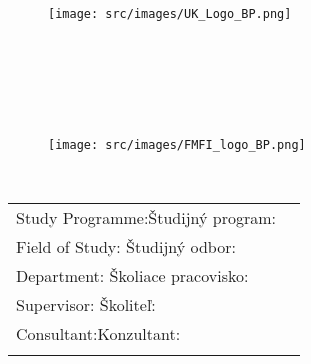 \documentclass[12pt, openany, oneside]{book}
\renewcommand{\includegraphics}[2][]{}
\begin{document}
\ifenglish{}
\else
\fi

\frontmatter
{}

\thispagestyle{empty}

{
    \sc\large

    \begin{center}
        \thesisuniversity{}\\
        \thesisfaculty{}

        \vfill

        \iflogoFMFI{}
            \begin{figure}[!hbt]
                \centering
                \texttt{[image: src/images/UK\_Logo\_BP.png]}
            \end{figure}
        \fi

        {\LARGE\thesisname}\\
        \thesistype{}
    \end{center}

    \vfill

    \noindent
    \thesisyear{}\\
    \thesisauthor{}
}

\cleardoublepage{}

\frontmatter
\thispagestyle{empty}

\begin{center}
    \sc\large
    \thesisuniversity{}\\
    \thesisfaculty{}

    \vfill

    \iflogoFMFI{}
        \begin{figure}[!hbt]
            \centering
            \texttt{[image: src/images/FMFI\_logo\_BP.png]}
        \end{figure}
    \fi

    {\LARGE\thesisname}\\
    \thesistype{}
\end{center}

\vfill

\noindent
\begin{tabular}{ll}
    \ifenglish{}Study Programme:\else{}Študijný program:   \fi & \thesisprogramme{}\\
    \ifenglish{}Field of Study: \else{}Študijný odbor:     \fi & \thesisfield{}\\
    \ifenglish{}Department:     \else{}Školiace pracovisko:\fi & \thesisdepartment{}\\
    \ifenglish{}Supervisor:     \else{}Školiteľ:           \fi & \thesissupervisor{}\\
    \ifconsultant{}\ifenglish{}Consultant:\else{}Konzultant:\fi & \thesisconsultant{}\\ \fi
\end{tabular}
\end{document}
